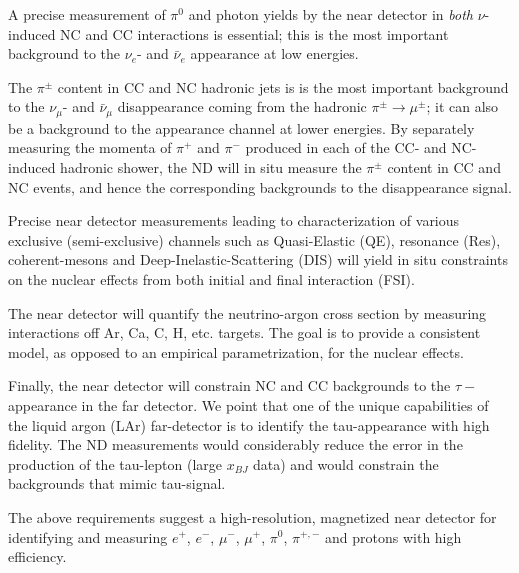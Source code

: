 A precise measurement of $\pi^0$ and photon yields by the near
detector in \textit{both} $\nu$-induced NC and CC interactions is
essential; this is the most important background to the $\nu_e$- and
$\bar \nu_e$ appearance at low energies.



The $\pi^{\pm}$ content in CC and NC hadronic jets is is the most important background to 
the $\nu_\mu$- and $\bar \nu_\mu$ disappearance coming from the hadronic   $\pi^{\pm} \rightarrow \mu^{\pm}$; 
it can also be a background to the appearance channel at lower energies. 
By separately measuring the momenta of $\pi^+$ and $\pi^-$ produced in each of 
the CC- and NC-induced hadronic shower, the ND 
will in situ measure the $\pi^{\pm}$ content in CC and NC events, and hence the corresponding backgrounds 
to the disappearance signal. 



Precise near detector measurements leading to characterization of 
 various exclusive (semi-exclusive) 
channels such as Quasi-Elastic (QE), resonance (Res), 
coherent-mesons and Deep-Inelastic-Scattering (DIS)
will yield in situ constraints on the nuclear effects from both
initial and final interaction (FSI).


The near detector will quantify the neutrino-argon cross section by
measuring interactions off Ar, Ca, C, H, etc. targets. The goal is to
provide a consistent model, as opposed to an empirical
parametrization, for the nuclear effects.


Finally, the near detector will constrain NC and CC backgrounds to the
$\tau-$ appearance in the far detector.  We point that one of the
unique capabilities of the liquid argon (LAr) far-detector is to
identify the tau-appearance with high fidelity. The ND measurements
would considerably reduce the error in the production of the
tau-lepton (large $x_{BJ}$ data) and would constrain the backgrounds
that mimic tau-signal.

The above requirements suggest a high-resolution, magnetized near
detector for identifying and measuring $e^+$, $e^-$, $\mu^-$, $\mu^+$,
$\pi^0$, $\pi^{+,-}$ and protons with high efficiency.



